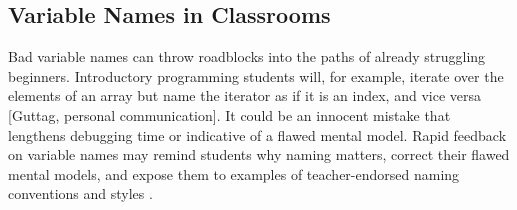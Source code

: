 \subsection{Variable Names in Classrooms}
Bad variable names can throw roadblocks into the paths of already struggling beginners. Introductory programming students will, for example, iterate over the elements of an array but name the iterator as if it is an index, and vice versa [Guttag, personal communication]. It could be an innocent mistake that lengthens debugging time or indicative of a flawed mental model. Rapid feedback on variable names may remind students why naming matters, correct their flawed mental models, and expose them to examples of teacher-endorsed naming conventions and styles \cite{ieeeRapidFeedback}.
